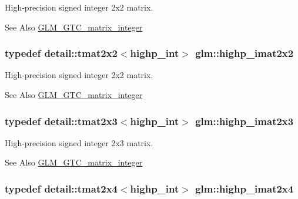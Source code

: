 High-\/precision signed integer 2x2 matrix. 

\begin{DoxySeeAlso}{See Also}
\hyperlink{group__gtc__matrix__integer}{G\-L\-M\-\_\-\-G\-T\-C\-\_\-matrix\-\_\-integer} 
\end{DoxySeeAlso}
\hypertarget{group__gtc__matrix__integer_ga5cd1cd0f7e30ec150285e6cf28d75975}{
\subsubsection[{highp\-\_\-imat2x2}]{\setlength{\rightskip}{0pt plus 5cm}typedef detail\-::tmat2x2$<$highp\-\_\-int$>$ {\bf glm\-::highp\-\_\-imat2x2}}}\label{group__gtc__matrix__integer_ga5cd1cd0f7e30ec150285e6cf28d75975}


High-\/precision signed integer 2x2 matrix. 

\begin{DoxySeeAlso}{See Also}
\hyperlink{group__gtc__matrix__integer}{G\-L\-M\-\_\-\-G\-T\-C\-\_\-matrix\-\_\-integer} 
\end{DoxySeeAlso}
\hypertarget{group__gtc__matrix__integer_ga06f89e9faac42bc0ac6628e83244a488}{
\subsubsection[{highp\-\_\-imat2x3}]{\setlength{\rightskip}{0pt plus 5cm}typedef detail\-::tmat2x3$<$highp\-\_\-int$>$ {\bf glm\-::highp\-\_\-imat2x3}}}\label{group__gtc__matrix__integer_ga06f89e9faac42bc0ac6628e83244a488}


High-\/precision signed integer 2x3 matrix. 

\begin{DoxySeeAlso}{See Also}
\hyperlink{group__gtc__matrix__integer}{G\-L\-M\-\_\-\-G\-T\-C\-\_\-matrix\-\_\-integer} 
\end{DoxySeeAlso}
\hypertarget{group__gtc__matrix__integer_gaf9ce65229f4b8fe1e956b83ca82cdfa7}{
\subsubsection[{highp\-\_\-imat2x4}]{\setlength{\rightskip}{0pt plus 5cm}typedef detail\-::tmat2x4$<$highp\-\_\-int$>$ {\bf glm\-::highp\-\_\-imat2x4}}}\label{group__gtc__matrix__integer_gaf9ce65229f4b8fe1e956b83ca82cdfa7}


